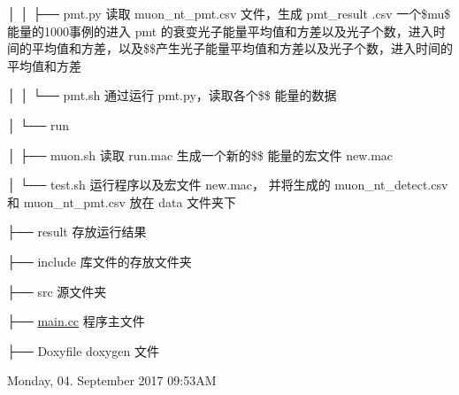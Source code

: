 │ │ ├── pmt.\+py 读取 muon\+\_\+nt\+\_\+pmt.\+csv 文件，生成 pmt\+\_\+result .csv 一个\$mu\$ 能量的1000事例的进入 pmt 的衰变光子能量平均值和方差以及光子个数，进入时间的平均值和方差，以及\$\$产生光子能量平均值和方差以及光子个数，进入时间的平均值和方差

│ │ └── pmt.\+sh 通过运行 pmt.\+py，读取各个\$\$ 能量的数据

│ └── run

│ ├── muon.\+sh 读取 run.\+mac 生成一个新的\$\$ 能量的宏文件 new.\+mac

│ └── test.\+sh 运行程序以及宏文件 new.\+mac， 并将生成的 muon\+\_\+nt\+\_\+detect.\+csv 和 muon\+\_\+nt\+\_\+pmt.\+csv 放在 data 文件夹下

├── result 存放运行结果

├── include 库文件的存放文件夹

├── src 源文件夹

├── \hyperlink{main_8cc}{main.\+cc} 程序主文件

├── Doxyfile doxygen 文件

Monday, 04. September 2017 09\+:53\+AM 